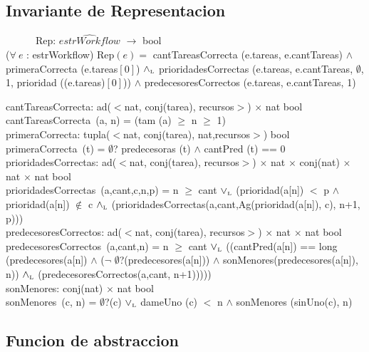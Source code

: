 \documentclass[a4paper,10pt]{article}
\newcommand{\sombrero}{\widehat}
\begin{document}
\subsection{Invariante de Representacion}

    \indent \ \ \ \ \ \ Rep: $\sombrero{estrWorkflow}$ $\rightarrow$ bool \\
    
($\forall\ e$ : estrWorkflow) Rep$(e) =$ cantTareasCorrecta (e.tareas, e.cantTareas) $\wedge$ primeraCorrecta (e.tareas$[0]$) $\land_{\mathrm{\scriptscriptstyle{L}}}$ prioridadesCorrectas (e.tareas, e.cantTareas, $\emptyset$, 1, prioridad ((e.tareas)$[0]$)) $\wedge$ predecesoresCorrectos (e.tareas, e.cantTareas, 1)

cantTareasCorrecta: ad($<$nat, conj(tarea), recursos$>$) $\times$ nat \en bool\\
	\indent cantTareasCorrecta\ (a, n) = (tam (a) $\geq$ n $\geq$ 1) \\    
	
primeraCorrecta: tupla($<$nat, conj(tarea), nat,recursos$>$)  \en bool\\
	\indent primeraCorrecta\ (t) = $\emptyset$? predecesoras (t) $\wedge$ cantPred (t) == 0 \\    
	
prioridadesCorrectas: ad($<$nat, conj(tarea), recursos$>$) $\times$ nat $\times$ conj(nat) $\times$ nat $\times$ nat \en bool\\
	\indent prioridadesCorrectas\ (a,cant,c,n,p) = n $\geq$ cant $\lor_{\mathrm{\scriptscriptstyle{L}}}$ (prioridad(a[n]) $<$ p $\wedge$ prioridad(a[n]) $\notin$ c $\land_{\mathrm{\scriptscriptstyle{L}}}$ (prioridadesCorrectas(a,cant,Ag(prioridad(a[n]), c), n+1, p))) \\ 
	
predecesoresCorrectos: ad($<$nat, conj(tarea), recursos$>$) $\times$ nat $\times$ nat \en bool\\
	\indent predecesoresCorrectos\ (a,cant,n) = n $\geq$ cant $\lor_{\mathrm{\scriptscriptstyle{L}}}$ ((cantPred(a[n]) == long (predecesores(a[n]) $\wedge$ ($\neg$ $\emptyset$?(predecesores(a[n])) $\wedge$ sonMenores(predecesores(a[n]), n)) $\land_{\mathrm{\scriptscriptstyle{L}}}$ (predecesoresCorrectos(a,cant, n+1))))) \\ 
	
sonMenores: conj(nat) $\times$ nat \en bool\\
	\indent sonMenores\ (c, n) = $\emptyset$?(c) $\lor_{\mathrm{\scriptscriptstyle{L}}}$ dameUno (c) $<$ n $\wedge$ sonMenores (sinUno(c), n)\\    

\subsection{Funcion de abstraccion}
   
\end{document}
